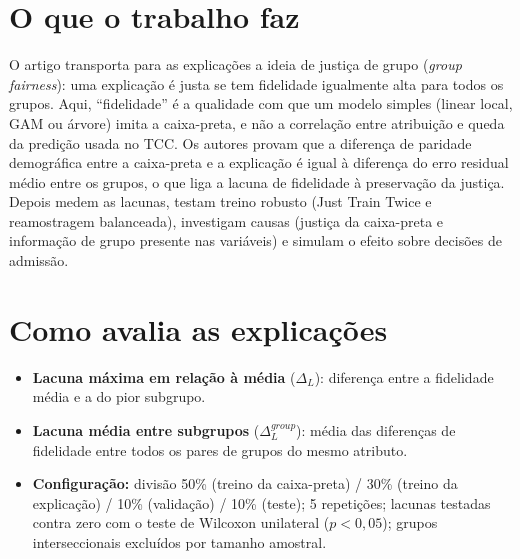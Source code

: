 \documentclass[11pt,a4paper]{article}
\begin{document}
\section{O que o trabalho faz}
O artigo transporta para as explicações a ideia de justiça de grupo (\textit{group fairness}): uma explicação é justa se tem fidelidade igualmente alta para todos os grupos. Aqui, “fidelidade” é a qualidade com que um modelo simples (linear local, GAM ou árvore) imita a caixa-preta, e não a correlação entre atribuição e queda da predição usada no TCC. Os autores provam que a diferença de paridade demográfica entre a caixa-preta e a explicação é igual à diferença do erro residual médio entre os grupos, o que liga a lacuna de fidelidade à preservação da justiça. Depois medem as lacunas, testam treino robusto (Just Train Twice e reamostragem balanceada), investigam causas (justiça da caixa-preta e informação de grupo presente nas variáveis) e simulam o efeito sobre decisões de admissão.

\section{Como avalia as explicações}
\begin{itemize}
  \item \textbf{Lacuna máxima em relação à média} ($\Delta_L$): diferença entre a fidelidade média e a do pior subgrupo.
  \item \textbf{Lacuna média entre subgrupos} ($\Delta_L^{group}$): média das diferenças de fidelidade entre todos os pares de grupos do mesmo atributo.
  \item \textbf{Configuração:} divisão 50\% (treino da caixa-preta) / 30\% (treino da explicação) / 10\% (validação) / 10\% (teste); 5 repetições; lacunas testadas contra zero com o teste de Wilcoxon unilateral ($p < 0{,}05$); grupos interseccionais excluídos por tamanho amostral.
\end{itemize}
\end{document}
